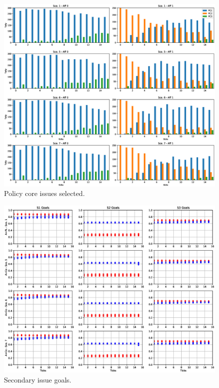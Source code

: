 \documentclass[12pt]{article}
\begin{document}
\begin{figure}
\centering
\includegraphics[width = 0.95\linewidth, angle = 0]{figures/PE_PL_PCSelected_+Co}
\caption{Policy core issues selected.}
\label{fig:PE_PL_PCSelected}
\end{figure}

\begin{figure}
\centering
\includegraphics[width = 0.95\linewidth, angle = 0]{figures/PE_PL_SGoals_+Co}
\caption{Secondary issue goals.}
\label{fig:PE_PL_SGoals}
\end{figure}
\end{document}
